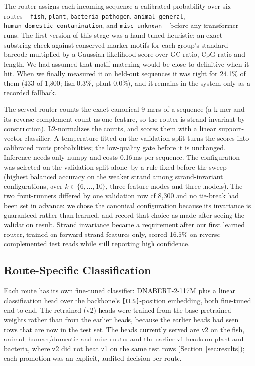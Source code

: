 \documentclass[conference]{IEEEtran}
\begin{document}
The router assigns each incoming sequence a calibrated probability over six routes -- \texttt{fish}, \texttt{plant}, \texttt{bacteria\_pathogen}, \texttt{animal\_general}, \texttt{human\_domestic\_contamination}, and \texttt{misc\_unknown} -- before any transformer runs. The first version of this stage was a hand-tuned heuristic: an exact-substring check against conserved marker motifs for each group's standard barcode \cite{klindworth201316s,miya2015mifish,cbol2009plant} multiplied by a Gaussian-likelihood score over GC ratio, CpG ratio and length. We had assumed that motif matching would be close to definitive when it hit. When we finally measured it on held-out sequences it was right for 24.1\% of them (433 of 1{,}800; fish 0.3\%, plant 0.0\%), and it remains in the system only as a recorded fallback.

The served router counts the exact canonical 9-mers of a sequence (a k-mer and its reverse complement count as one feature, so the router is strand-invariant by construction), L2-normalizes the counts, and scores them with a linear support-vector classifier. A temperature fitted on the validation split \cite{guo2017calibration} turns the scores into calibrated route probabilities; the low-quality gate before it is unchanged. Inference needs only numpy and costs 0.16\,ms per sequence. The configuration was selected on the validation split alone, by a rule fixed before the sweep (highest balanced accuracy on the weaker strand among strand-invariant configurations, over $k \in \{6,\dots,10\}$, three feature modes and three models). The two front-runners differed by one validation row of 8{,}300 and no tie-break had been set in advance; we chose the canonical configuration because its invariance is guaranteed rather than learned, and record that choice as made after seeing the validation result. Strand invariance became a requirement after our first learned router, trained on forward-strand features only, scored 16.6\% on reverse-complemented test reads while still reporting high confidence.

\subsection{Route-Specific Classification}
\label{sec:routeclassifiers}

Each route has its own fine-tuned classifier: DNABERT-2-117M \cite{zhou2023dnabert2} plus a linear classification head over the backbone's \texttt{[CLS]}-position embedding, both fine-tuned end to end. The retrained (v2) heads were trained from the base pretrained weights rather than from the earlier heads, because the earlier heads had seen rows that are now in the test set. The heads currently served are v2 on the fish, animal, human/domestic and misc routes and the earlier v1 heads on plant and bacteria, where v2 did not beat v1 on the same test rows (Section~\ref{sec:results}); each promotion was an explicit, audited decision per route.
\end{document}
